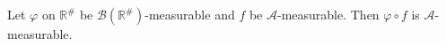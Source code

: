 Let $\varphi$ on $\mathbb{R}^\#$ be $\mathcal{B}(\mathbb{R}^\#)$-measurable and $f$ be $\mathcal{A}$-measurable. Then $\varphi \circ f$ is $\mathcal{A}$-measurable.